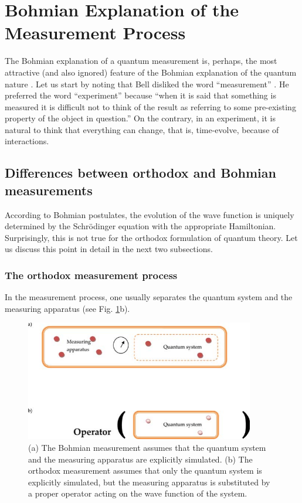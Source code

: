 \documentclass[onecolumn,nofootinbib, secnumarabic, amsmath, nobibnotes,11pt,aps,pra]{revtex4-1}
\newcommand{\fref}[1]{Fig. \ref{#1}}
\begin{document}
\section{Bohmian Explanation of the Measurement Process}\label{om.sec_measurement}

The Bohmian explanation of a quantum measurement is, perhaps, the most attractive (and also ignored) feature of the Bohmian explanation of the quantum nature \cite{om.bell1990,om.Durrllibre,om.Goldsteinobserver,om.Bell1966,om.bomhhiley1993}. Let us start by noting that Bell disliked the word ``measurement'' \cite{om.bell1990}. He preferred the word ``experiment'' because ``when it is said that something is measured it is difficult not to think of the result as referring to some pre-existing property of the object in question.'' On the contrary, in an experiment, it is natural to think that everything can change, that is, time-evolve, because of interactions.

\subsection{Differences between orthodox and Bohmian measurements}

According to Bohmian postulates, the evolution of the wave function
is uniquely determined by the Schr\"odinger equation with the
appropriate Hamiltonian. Surprisingly, this is not true for the
orthodox formulation of quantum theory. Let us discuss this point in
detail in  the  next two subsections.

\subsubsection{The orthodox measurement process}

In the measurement process, one usually separates the quantum system and the measuring apparatus (see \fref{om_measure2}b).

\begin{figure}
\includegraphics[width=10cm]{ch1-09.pdf}
\caption{(a) The Bohmian measurement assumes that the quantum system and the measuring apparatus are explicitly simulated. (b) The orthodox measurement assumes that only the quantum system is explicitly simulated, but the measuring apparatus is substituted by a proper operator acting on the wave function of the system.}
\label{om_measure2}
\end{figure}
\end{document}
